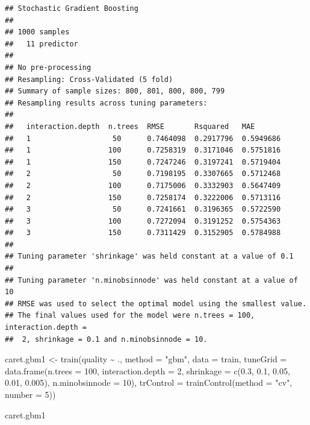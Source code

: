 \documentclass[
]{book}
\newenvironment{Shaded}{\begin{snugshade}}{\end{snugshade}}
\newcommand{\AttributeTok}[1]{\textcolor[rgb]{0.77,0.63,0.00}{#1}}
\newcommand{\DecValTok}[1]{\textcolor[rgb]{0.00,0.00,0.81}{#1}}
\newcommand{\FloatTok}[1]{\textcolor[rgb]{0.00,0.00,0.81}{#1}}
\newcommand{\FunctionTok}[1]{\textcolor[rgb]{0.00,0.00,0.00}{#1}}
\newcommand{\NormalTok}[1]{#1}
\newcommand{\OtherTok}[1]{\textcolor[rgb]{0.56,0.35,0.01}{#1}}
\newcommand{\SpecialCharTok}[1]{\textcolor[rgb]{0.00,0.00,0.00}{#1}}
\newcommand{\StringTok}[1]{\textcolor[rgb]{0.31,0.60,0.02}{#1}}
\theoremstyle{break}
\theoremstyle{definition}
\theoremstyle{definition}
\theoremstyle{definition}
\theoremstyle{definition}
\theoremstyle{remark}
\begin{document}
\begin{verbatim}
## Stochastic Gradient Boosting 
## 
## 1000 samples
##   11 predictor
## 
## No pre-processing
## Resampling: Cross-Validated (5 fold) 
## Summary of sample sizes: 800, 801, 800, 800, 799 
## Resampling results across tuning parameters:
## 
##   interaction.depth  n.trees  RMSE       Rsquared   MAE      
##   1                   50      0.7464098  0.2917796  0.5949686
##   1                  100      0.7258319  0.3171046  0.5751816
##   1                  150      0.7247246  0.3197241  0.5719404
##   2                   50      0.7198195  0.3307665  0.5712468
##   2                  100      0.7175006  0.3332903  0.5647409
##   2                  150      0.7258174  0.3222006  0.5713116
##   3                   50      0.7241661  0.3196365  0.5722590
##   3                  100      0.7272094  0.3191252  0.5754363
##   3                  150      0.7311429  0.3152905  0.5784988
## 
## Tuning parameter 'shrinkage' was held constant at a value of 0.1
## 
## Tuning parameter 'n.minobsinnode' was held constant at a value of 10
## RMSE was used to select the optimal model using the smallest value.
## The final values used for the model were n.trees = 100, interaction.depth =
##  2, shrinkage = 0.1 and n.minobsinnode = 10.
\end{verbatim}

\begin{Shaded}
\begin{Highlighting}[]
\NormalTok{caret.gbm1 }\OtherTok{\textless{}{-}} \FunctionTok{train}\NormalTok{(quality }\SpecialCharTok{\textasciitilde{}}\NormalTok{ ., }\AttributeTok{method =} \StringTok{"gbm"}\NormalTok{, }\AttributeTok{data =}\NormalTok{ train,}
   \AttributeTok{tuneGrid =} \FunctionTok{data.frame}\NormalTok{(}\AttributeTok{n.trees =}  \DecValTok{100}\NormalTok{, }\AttributeTok{interaction.depth =} \DecValTok{2}\NormalTok{, }
                        \AttributeTok{shrinkage =} \FunctionTok{c}\NormalTok{(}\FloatTok{0.3}\NormalTok{, }\FloatTok{0.1}\NormalTok{, }\FloatTok{0.05}\NormalTok{, }\FloatTok{0.01}\NormalTok{, }\FloatTok{0.005}\NormalTok{),}
                        \AttributeTok{n.minobsinnode =} \DecValTok{10}\NormalTok{),}
   \AttributeTok{trControl =} \FunctionTok{trainControl}\NormalTok{(}\AttributeTok{method =} \StringTok{"cv"}\NormalTok{, }\AttributeTok{number =} \DecValTok{5}\NormalTok{))}
\end{Highlighting}
\end{Shaded}

\begin{Shaded}
\begin{Highlighting}[]
\NormalTok{caret.gbm1}
\end{Highlighting}
\end{Shaded}
\end{document}
